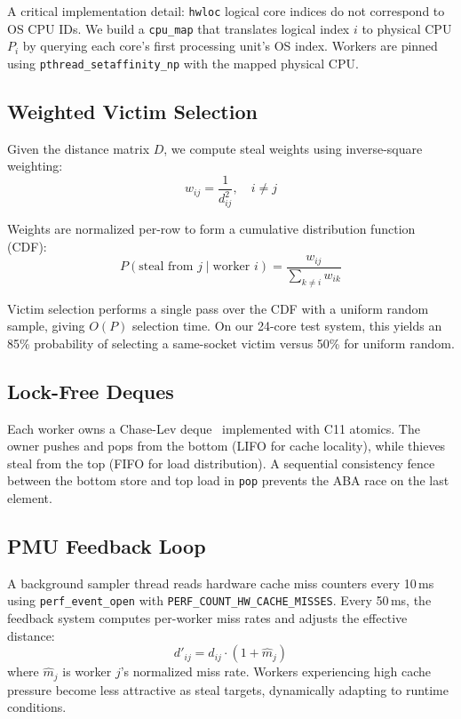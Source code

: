 \documentclass[conference]{IEEEtran}
\begin{document}
A critical implementation detail: \texttt{hwloc} logical core indices do not correspond to OS CPU IDs. We build a \texttt{cpu\_map} that translates logical index $i$ to physical CPU $P_i$ by querying each core's first processing unit's OS index. Workers are pinned using \texttt{pthread\_setaffinity\_np} with the mapped physical CPU.

\subsection{Weighted Victim Selection}

Given the distance matrix $D$, we compute steal weights using inverse-square weighting:
\begin{equation}
    w_{ij} = \frac{1}{d_{ij}^2}, \quad i \neq j
\end{equation}

Weights are normalized per-row to form a cumulative distribution function (CDF):
\begin{equation}
    P(\text{steal from } j \mid \text{worker } i) = \frac{w_{ij}}{\sum_{k \neq i} w_{ik}}
\end{equation}

Victim selection performs a single pass over the CDF with a uniform random sample, giving $O(P)$ selection time. On our 24-core test system, this yields an 85\% probability of selecting a same-socket victim versus 50\% for uniform random.

\subsection{Lock-Free Deques}

Each worker owns a Chase-Lev deque~\cite{chaselev} implemented with C11 atomics. The owner pushes and pops from the bottom (LIFO for cache locality), while thieves steal from the top (FIFO for load distribution). A sequential consistency fence between the bottom store and top load in \texttt{pop} prevents the ABA race on the last element.

\subsection{PMU Feedback Loop}

A background sampler thread reads hardware cache miss counters every 10\,ms using \texttt{perf\_event\_open} with \texttt{PERF\_COUNT\_HW\_CACHE\_MISSES}. Every 50\,ms, the feedback system computes per-worker miss rates and adjusts the effective distance:
\begin{equation}
    d'_{ij} = d_{ij} \cdot (1 + \hat{m}_j)
\end{equation}
where $\hat{m}_j$ is worker $j$'s normalized miss rate. Workers experiencing high cache pressure become less attractive as steal targets, dynamically adapting to runtime conditions.
\end{document}
